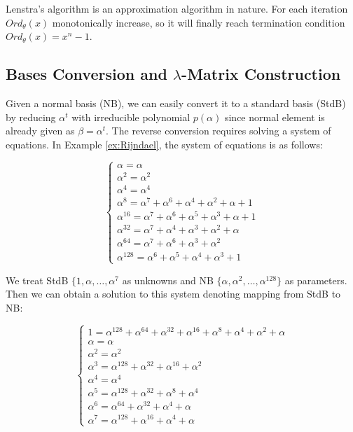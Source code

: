 Lenstra's algorithm is an approximation algorithm in nature. For each iteration $Ord_\theta(x)$ monotonically increase,
so it will finally reach termination condition $Ord_\theta(x) = x^n-1$.
\subsection{Bases Conversion and $\lambda$-Matrix Construction}
Given a normal basis (NB), we can easily convert it to a standard basis (StdB) by reducing $\alpha^t$
with irreducible polynomial $p(\alpha)$ since 
normal element is already given as $\beta = \alpha^t$. The reverse conversion requires 
solving a system of equations. In Example \ref{ex:Rijndael}, the system of equations
is as follows:

\begin{equation}
\begin{cases}
\alpha = \alpha \\
\alpha^2 = \alpha^2 \\
\alpha^4 = \alpha^4 \\
\alpha^8 = \alpha^7 + \alpha^6+\alpha^4+\alpha^2+\alpha+1\\
\alpha^{16} = \alpha^7+\alpha^6+\alpha^5+\alpha^3+\alpha+1\\
\alpha^{32} = \alpha^7+\alpha^4+\alpha^3+\alpha^2+\alpha\\
\alpha^{64} = \alpha^7+\alpha^6+\alpha^3+\alpha^2\\
\alpha^{128} = \alpha^6+\alpha^5+\alpha^4+\alpha^3+1
\end{cases}
\end{equation}

We treat StdB $\{1,\alpha,\dots,\alpha^7$ as unknowns and NB $\{\alpha,\alpha^2,\dots,\alpha^{128}\}$
as parameters. Then we can obtain a solution to this system denoting mapping from StdB to NB:

\begin{equation}
\begin{cases}
1 = \alpha^{128}+\alpha^{64}+\alpha^{32}+\alpha^{16}+\alpha^8+\alpha^4+\alpha^2+\alpha \\
\alpha = \alpha \\
\alpha^2 = \alpha^2 \\
\alpha^3 = \alpha^{128} + \alpha^{32}+\alpha^{16}+\alpha^2\\
\alpha^4 = \alpha^4\\
\alpha^5 = \alpha^{128} + \alpha^{32}+\alpha^{8}+\alpha^4\\
\alpha^6 = \alpha^{64} + \alpha^{32}+\alpha^{4}+\alpha\\
\alpha^7 = \alpha^{128} + \alpha^{16}+\alpha^{4}+\alpha
\end{cases}
\end{equation}


